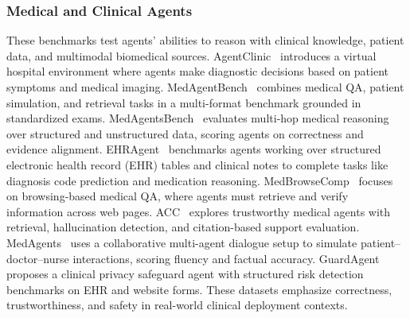 \subsubsection{Medical and Clinical Agents}
These benchmarks test agents’ abilities to reason with clinical knowledge, patient data, and multimodal biomedical sources. AgentClinic~\cite{samuel2024agentclinic} introduces a virtual hospital environment where agents make diagnostic decisions based on patient symptoms and medical imaging. MedAgentBench~\cite{yixing2025medagentbench} combines medical QA, patient simulation, and retrieval tasks in a multi-format benchmark grounded in standardized exams. MedAgentsBench~\cite{xiangru2025medagentsbench} evaluates multi-hop medical reasoning over structured and unstructured data, scoring agents on correctness and evidence alignment. EHRAgent~\cite{wenqi2024ehragent} benchmarks agents working over structured electronic health record (EHR) tables and clinical notes to complete tasks like diagnosis code prediction and medication reasoning. MedBrowseComp~\cite{chen2025medbrowsecomp} focuses on browsing-based medical QA, where agents must retrieve and verify information across web pages. ACC~\cite{thakrar2025architectingclinicalcollaborationmultiagent} explores trustworthy medical agents with retrieval, hallucination detection, and citation-based support evaluation. MedAgents~\cite{xiangru2023medagents} uses a collaborative multi-agent dialogue setup to simulate patient–doctor–nurse interactions, scoring fluency and factual accuracy. GuardAgent~\cite{zhen2024guardagent} proposes a clinical privacy safeguard agent with structured risk detection benchmarks on EHR and website forms. These datasets emphasize correctness, trustworthiness, and safety in real-world clinical deployment contexts.

